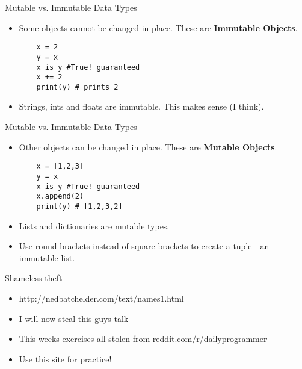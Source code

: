 \documentclass{beamer}
\begin{document}
\begin{frame}[fragile]{Mutable vs. Immutable Data Types}
\begin{itemize}
\item{Some objects cannot be changed in place. These are \textbf{Immutable Objects}.}
\begin{block}{}
	\begin{lstlisting}
	x = 2
	y = x 
	x is y #True! guaranteed
	x += 2
	print(y) # prints 2
	\end{lstlisting}
	\end{block}
\pause
\item{Strings, ints and floats are immutable. This makes sense (I think).}
\end{itemize}
\end{frame}


\begin{frame}[fragile]{Mutable vs. Immutable Data Types}
\begin{itemize}
\item{Other objects can be changed in place. These are \textbf{Mutable Objects}.}
\begin{block}{}
	\begin{lstlisting}
	x = [1,2,3] 
	y = x 
	x is y #True! guaranteed
	x.append(2) 
	print(y) # [1,2,3,2]
	\end{lstlisting}
	\end{block}
\pause
\item{Lists and dictionaries are mutable types.}
\pause
\item{ Use round brackets instead of square brackets to create a tuple - an immutable list.}
\end{itemize}
\end{frame}

\begin{frame}[fragile]{Shameless theft}
\begin{itemize}
\item{ http://nedbatchelder.com/text/names1.html} 
\item{I will now steal this guys talk}
\item{This weeks exercises all stolen from reddit.com/r/dailyprogrammer}
\item{Use this site for practice!}
\end{itemize}
\end{frame}
\end{document}
